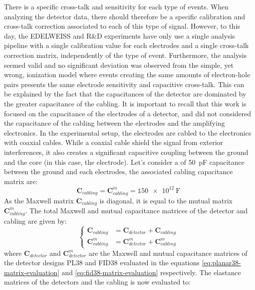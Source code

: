 There is a specific cross-talk and sensitivity for each type of events. When analyzing the detector data, there should therefore be a specific calibration and cross-talk correction associated to each of this type of signal.
However, to this day, the EDELWEISS and R\&D experiments have only use a single analysis pipeline with a single calibration value for each electrodes and a single cross-talk correction matrix, independently of the type of event. Furthermore, the analysis seemed valid and no significant deviation was observed from the simple, yet wrong, ionization model where events creating the same amounts of electron-hole pairs presents the same electrode sensitivity and capacitive cross-talk. This can be explained by the fact that the capacitances of the detector are dominated by the greater capacitance of the cabling. It is important to recall that this work is focused on the capacitance of the electrodes of a detector, and did not considered the capacitance of the cabling between the electrodes and the amplifying electronics. In the experimental setup, the electrodes are cabled to the electronics with coaxial cables. While a coaxial cable shield the signal from exterior interferences, it also creates a significant capacitive coupling between the ground and the core (in this case, the electrode). Let's consider a of \SI{50}{\pico\farad} capacitance between the ground and each electrodes, the associated cabling capacitance matrix are:
\begin{equation}
\bm{C}_{cabling} = \bm{C}_{cabling}^m = \mathbb{1} \SI{50e12}{\farad}
\end{equation}
As the Maxwell matrix $\bm{C}_{cabling}$ is diagonal, it is equal to the mutual matrix $\bm{C}_{cabling}^m$. The total Maxwell and mutual capacitance matrices of the detector and cabling are given by:
\begin{equation}
\begin{cases} 
\bm{C}_{cabling} &= \bm{C}_{detector} + \bm{C}_{cabling} \\
\bm{C}_{cabling}^m &= \bm{C}_{detector}^m + \bm{C}_{cabling}^m
\end{cases}
\end{equation}
where $\bm{C}_{detector}$ and $\bm{C}_{detector}^m$ are the Maxwell and mutual capacitance matrices of the detector designs PL38 and FID38 evaluated in the equations \ref{eq:planar38-matrix-evaluation} and \ref{eq:fid38-matrix-evaluation} respectively.
The elastance matrices of the detectors and the cabling is now evaluated to:

